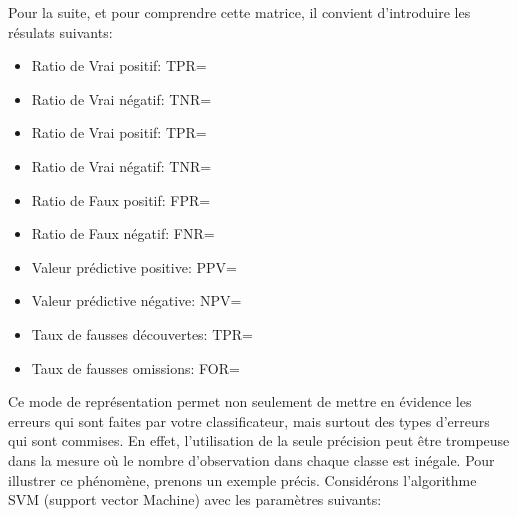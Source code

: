 \documentclass[a4paper]{report}
\begin{document}
Pour la suite, et pour comprendre cette matrice, il convient d'introduire les résulats suivants:\\
\begin{itemize}\setlength{\itemsep}{5mm}
	\item Ratio de Vrai positif: TPR=
	
	\item Ratio de Vrai négatif: TNR=
	
	\item Ratio de Vrai positif: TPR=
	
	\item Ratio de Vrai négatif: TNR=
	
	\item Ratio de Faux positif: FPR=
	
	\item Ratio de Faux négatif: FNR=
	
	\item Valeur prédictive positive: PPV=
	
	\item Valeur prédictive négative: NPV=
	
	\item Taux de fausses découvertes: TPR=
	
	\item Taux de fausses omissions: FOR=
	
\end{itemize}
\bigskip\bigskip

Ce mode de représentation permet non seulement de mettre en évidence les erreurs qui sont faites par votre classificateur, mais surtout des types d'erreurs qui sont commises. En effet, l’utilisation de la seule précision peut être trompeuse dans la mesure où le nombre d’observation dans chaque classe est inégale. 
Pour illustrer ce phénomène, prenons un exemple précis. Considérons l’algorithme SVM (support vector Machine) avec les paramètres suivants:
\medbreak

\medbreak
\end{document}
